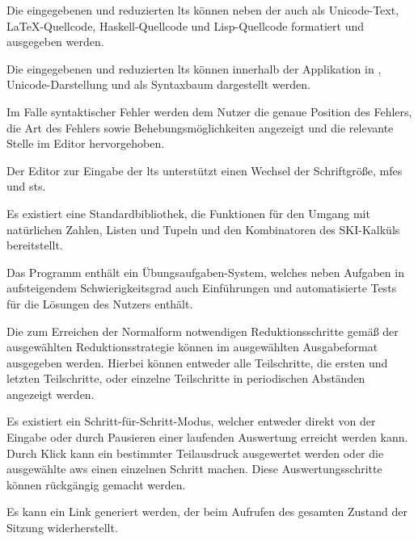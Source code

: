 \documentclass[parskip=full,11pt,twoside]{scrartcl}
\begin{document}
Die eingegebenen und reduzierten \glspl{lt} können neben der 
auch als Unicode-Text, \LaTeX-Quellcode, Haskell-Quellcode und Lisp-Quellcode formatiert und ausgegeben
werden.

Die eingegebenen und reduzierten \glspl{lt} können innerhalb der Applikation in
, Unicode-Darstellung und als Syntaxbaum
dargestellt werden.

Im Falle syntaktischer Fehler werden dem Nutzer die genaue Position des Fehlers, die
Art des Fehlers sowie Behebungsmöglichkeiten angezeigt und die relevante Stelle im
Editor hervorgehoben.

Der Editor zur Eingabe der \glspl{lt} unterstützt einen Wechsel der Schriftgröße,
\glspl{mfe} und \glspl{st}.

Es existiert eine Standardbibliothek, die Funktionen für den Umgang mit natürlichen
Zahlen, Listen und Tupeln und den Kombinatoren des SKI-Kalküls bereitstellt.

Das Programm enthält ein Übungsaufgaben-System, welches neben Aufgaben in aufsteigendem
Schwierigkeitsgrad auch Einführungen und automatisierte Tests für die Lösungen des Nutzers
enthält.

Die zum Erreichen der Normalform notwendigen Reduktionsschritte gemäß der ausgewählten
Reduktionsstrategie können im ausgewählten Ausgabeformat ausgegeben werden. Hierbei
können entweder alle Teilschritte, die ersten und letzten Teilschritte, oder
einzelne Teilschritte in periodischen Abständen angezeigt werden.

Es existiert ein Schritt-für-Schritt-Modus, welcher entweder direkt von der Eingabe
oder durch Pausieren einer laufenden Auswertung erreicht werden kann.
Durch Klick kann ein bestimmter Teilausdruck ausgewertet werden oder die ausgewählte
\gls{aws} einen einzelnen Schritt machen. Diese Auswertungsschritte können rückgängig
gemacht werden.

Es kann ein Link generiert werden, der beim Aufrufen des gesamten Zustand
der Sitzung widerherstellt.
\end{document}
